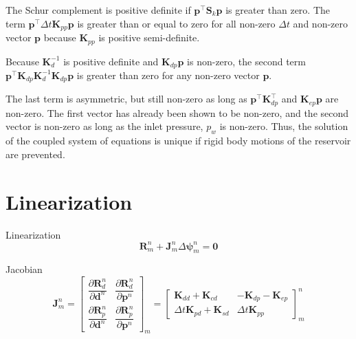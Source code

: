 \documentclass{article}
\begin{document}
The Schur complement is positive definite if $\mathbf{p}^{\top} \mathbf{S}_k \mathbf{p}$ is greater than zero.
The term $\mathbf{p}^{\top} \Delta t\mathbf{K}_{pp} \mathbf{p}$ is greater than or equal to zero for all non-zero $\Delta t$ and non-zero vector $\mathbf{p}$ because $\mathbf{K}_{pp}$ is positive semi-definite.

Because $\mathbf{K}_{d}^{-1}$ is positive definite and $\mathbf{K}_{dp} \mathbf{p}$ is non-zero, the second term $\mathbf{p}^{\top} \mathbf{K}_{dp} \mathbf{K}_{d}^{-1} \mathbf{K}_{dp} \mathbf{p}$ is greater than zero for any non-zero vector $\mathbf{p}$.

The last term is asymmetric, but still non-zero as long as $\mathbf{p}^{\top} \mathbf{K}_{dp}^{\top}$ and $\mathbf{K}_{ep} \mathbf{p}$ are non-zero. The first vector has already been shown to be non-zero, and the second vector is non-zero as long as the inlet pressure, $p_w$ is non-zero.
Thus, the solution of the coupled system of equations is unique if rigid body motions of the reservoir are prevented.

\section{Linearization}
Linearization
\begin{equation}
\mathbf{R}^n_m + \mathbf{J}^n_m \Delta \boldsymbol{\psi}^n_m = \mathbf{0}
\end{equation}

Jacobian 
\begin{equation}
\mathbf{J}^n_m = 
\begin{bmatrix}
\dfrac{\partial \mathbf{R}_d^n}{\partial \mathbf{d}^n}
& 
\dfrac{\partial \mathbf{R}_d^n}{\partial \mathbf{p}^n}
\\[1.2em]
\dfrac{\partial \mathbf{R}_p^n}{\partial \mathbf{d}^n}
& 
\dfrac{\partial \mathbf{R}_p^n}{\partial \mathbf{p}^n}
\end{bmatrix}_m
= \begin{bmatrix}
\mathbf{K}_{dd} + \mathbf{K}_{cd}
& 
-\mathbf{K}_{dp} - \mathbf{K}_{ep}
\\[1.2em]
\Delta t\mathbf{K}_{pd} + \mathbf{K}_{sd}
& 
\Delta t\mathbf{K}_{pp}
\end{bmatrix}^n_m
\end{equation}	
\end{document}
